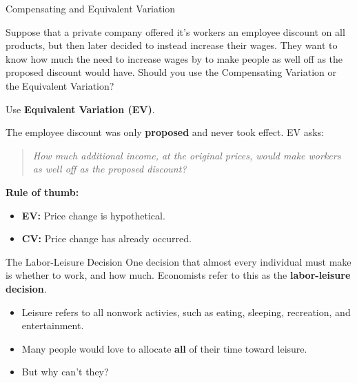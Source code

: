 \documentclass{beamer}
\begin{document}
\begin{frame}{Compensating and Equivalent Variation}
  
  \bigskip
  Suppose that a private company offered it's workers an employee discount on all products, but then later decided to instead increase their wages. They want to know how much the need to increase wages by to make people as well off as the proposed discount would have. Should you use the Compensating Variation or the Equivalent Variation?
\end{frame}

\begin{frame}

  \bigskip

  Use \textbf{Equivalent Variation (EV)}.

  \bigskip

  The employee discount was only \textbf{proposed} and never took effect. EV asks:

  \begin{quote}
    \emph{How much additional income, at the original prices, would make workers as well off as the proposed discount?}
  \end{quote}

  \bigskip

  \textbf{Rule of thumb:}
  \begin{itemize}
    \item \textbf{EV:} Price change is hypothetical.
    \item \textbf{CV:} Price change has already occurred.
  \end{itemize}

\end{frame}

\begin{frame}{The Labor-Leisure Decision}
  One decision that almost every individual must make is whether to work, and how much. Economists refer to this as the \textbf{labor-leisure decision}. 

  \bigskip
  \begin{itemize}
    \item Leisure refers to all nonwork activies, such as eating, sleeping, recreation, and entertainment.

    \item Many people would love to allocate \textbf{all} of their time toward leisure.

    \item But why can't they?
  \end{itemize}
\end{frame}
\end{document}
